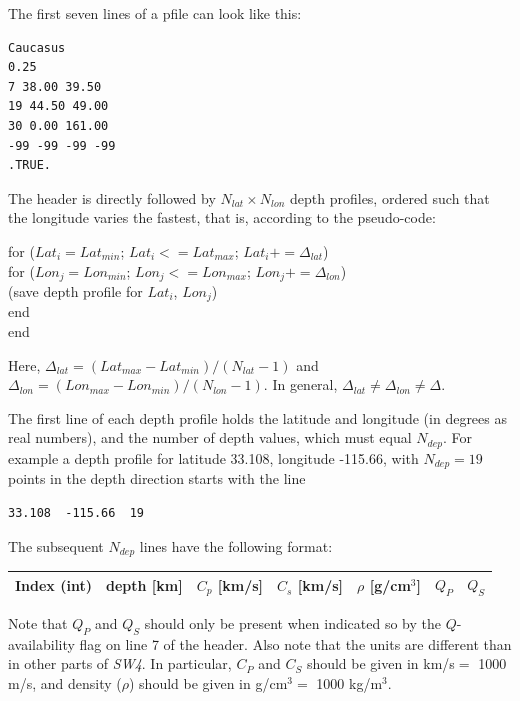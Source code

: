 \documentclass[11pt]{report}
\begin{document}
{The first seven lines of a pfile can look like this:
\begin{verbatim}
Caucasus
0.25
7 38.00 39.50
19 44.50 49.00
30 0.00 161.00
-99 -99 -99 -99
.TRUE.
\end{verbatim}

The header is directly followed by $N_{lat}\times N_{lon}$ depth profiles, ordered such that the longitude
varies the fastest, that is, according to the pseudo-code:
\begin{flushleft}
	\hspace{10mm}  for ($Lat_i= Lat_{min}$; $Lat_i <= Lat_{max}$; $Lat_i += \Delta_{lat}$)\\
	\hspace{20mm}    for ($Lon_j= Lon_{min}$; $Lon_j <= Lon_{max}$; $Lon_j += \Delta_{lon}$)\\
	\hspace{30mm}      (save depth profile for $Lat_i$, $Lon_j$)\\
	\hspace{20mm}    end\\
	\hspace{10mm}  end
\end{flushleft}
Here, $\Delta_{lat} = (Lat_{max} - Lat_{min})/(N_{lat}-1)$ and  $\Delta_{lon} = (Lon_{max} -
	Lon_{min})/(N_{lon}-1)$. In general, $\Delta_{lat}\ne \Delta_{lon}\ne\Delta$.

The first line of each depth profile holds the latitude and longitude (in degrees as real
numbers), and the number of depth values, which must equal $N_{dep}$. For example a depth profile
for latitude 33.108, longitude -115.66, with $N_{dep}=19$ points in the depth direction starts with the line
\begin{verbatim}
33.108  -115.66  19
\end{verbatim}
The subsequent $N_{dep}$ lines have the following format:
\begin{center}
	\begin{tabular}{lllllll}\hline
		Index (int) & depth [km] & $C_p$ [km/s] & $C_s$ [km/s] & $\rho$ [g/cm$^3$] & $Q_P$ & $Q_S$ \\ \hline
	\end{tabular}
\end{center}
Note that $Q_P$ and $Q_S$ should only be present when indicated so by the $Q$-availability flag on
line 7 of the header. Also note that the units are different than in other parts of \emph{SW4}. In
particular, $C_P$ and $C_S$ should be given in km/s$=$ 1000 m/s, and density ($\rho$) should be
given in g/cm$^3=$ 1000 kg/m$^3$.

}
\end{document}
